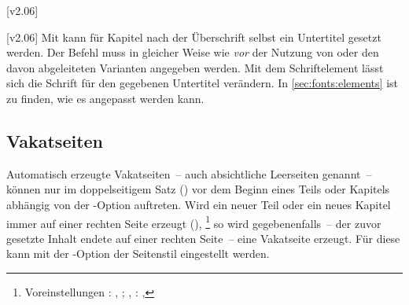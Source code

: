 \begin{DeclareEntity*}{}
\begin{DeclareEntity*}{}
\begin{DeclareEntity*}{}
\begin{Declaration}
  {}
  [v2.06]
\begin{Declaration}
  {}
  [v2.06]
Mit  kann für Kapitel nach der 
Überschrift selbst ein Untertitel gesetzt werden. Der Befehl muss in gleicher 
Weise wie  \emph{vor} der Nutzung von  
oder den davon abgeleiteten Varianten angegeben werden. Mit dem Schriftelement 
 lässt sich die Schrift für den gegebenen Untertitel 
verändern. In \autoref{sec:fonts:elements} ist zu finden, wie es angepasst 
werden kann.
\end{Declaration}
\end{Declaration}



\subsection{%
  Vakatseiten%
  \label{sec:vacat}%
}
%
Automatisch erzeugte Vakatseiten~-- auch absichtliche Leerseiten genannt~-- 
können nur im doppelseitigem Satz () vor dem Beginn eines 
Teils oder Kapitels abhängig von der \KOMAScript-Option 
 auftreten. Wird ein neuer Teil oder 
ein neues Kapitel immer auf einer rechten Seite erzeugt (),%
\footnote{%
  Voreinstellungen
  : 
  , ;
  , : 
  , %
}
so wird gegebenenfalls~-- der zuvor gesetzte Inhalt endete auf einer rechten 
Seite~-- eine Vakatseite erzeugt. Für diese kann mit der \KOMAScript-Option 
 der Seitenstil 
eingestellt werden.


\end{DeclareEntity*}
\end{DeclareEntity*}
\end{DeclareEntity*}

